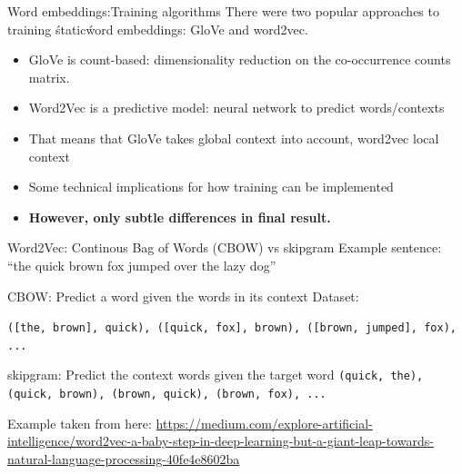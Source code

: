\documentclass[compress]{beamer}
\begin{document}
\begin{frame}{Word embeddings:Training algorithms}
	There were two popular approaches to training \'static\' word embeddings: GloVe and word2vec.
	\begin{itemize}
		\item GloVe is count-based: dimensionality reduction on the co-occurrence counts matrix.
		\item Word2Vec is a predictive model: neural network to predict words/contexts
		\item That means that GloVe takes global context into account, word2vec local context
		\item Some technical implications for how training can be implemented 
		\item \textbf{However, only subtle differences in final result.}
	\end{itemize}
	
\end{frame}

\begin{frame}{Word2Vec: Continous Bag of Words (CBOW) vs skipgram}
	Example sentence: ``the quick brown fox jumped over the lazy dog''
	\begin{block}{CBOW: Predict a word given the words in its context}
		Dataset:
		
		\texttt{([the, brown], quick), ([quick, fox], brown), ([brown, jumped], fox), ...}
	\end{block}
	
	\pause
	
	
	\begin{block}{skipgram: Predict the context words given the target word}	
		\texttt{(quick, the), (quick, brown), (brown, quick), (brown, fox), ...}
	\end{block}
	
	\tiny{Example taken from here: \url{https://medium.com/explore-artificial-intelligence/word2vec-a-baby-step-in-deep-learning-but-a-giant-leap-towards-natural-language-processing-40fe4e8602ba}}
\end{frame}

\end{document}
